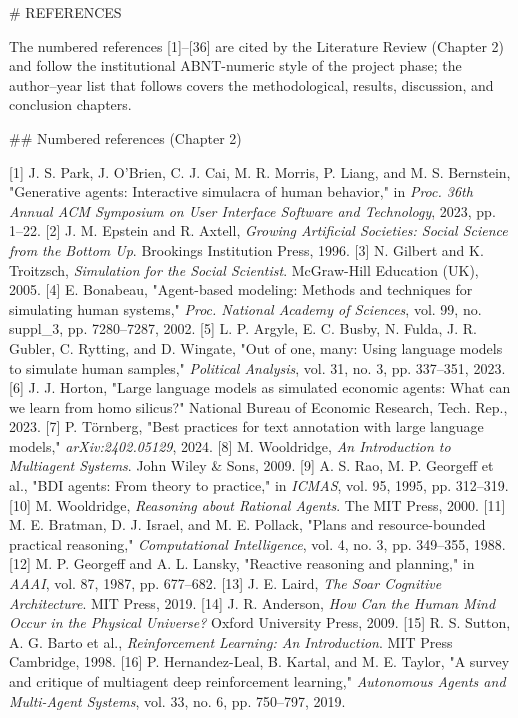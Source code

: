 \# REFERENCES

The numbered references [1]–[36] are cited by the Literature Review (Chapter 2) and follow the institutional ABNT-numeric style of the project phase; the author–year list that follows covers the methodological, results, discussion, and conclusion chapters.

\#\# Numbered references (Chapter 2)

[1] J. S. Park, J. O'Brien, C. J. Cai, M. R. Morris, P. Liang, and M. S. Bernstein, "Generative agents: Interactive simulacra of human behavior," in \textit{Proc. 36th Annual ACM Symposium on User Interface Software and Technology}, 2023, pp. 1–22.
[2] J. M. Epstein and R. Axtell, \textit{Growing Artificial Societies: Social Science from the Bottom Up}. Brookings Institution Press, 1996.
[3] N. Gilbert and K. Troitzsch, \textit{Simulation for the Social Scientist}. McGraw-Hill Education (UK), 2005.
[4] E. Bonabeau, "Agent-based modeling: Methods and techniques for simulating human systems," \textit{Proc. National Academy of Sciences}, vol. 99, no. suppl\_3, pp. 7280–7287, 2002.
[5] L. P. Argyle, E. C. Busby, N. Fulda, J. R. Gubler, C. Rytting, and D. Wingate, "Out of one, many: Using language models to simulate human samples," \textit{Political Analysis}, vol. 31, no. 3, pp. 337–351, 2023.
[6] J. J. Horton, "Large language models as simulated economic agents: What can we learn from homo silicus?" National Bureau of Economic Research, Tech. Rep., 2023.
[7] P. Törnberg, "Best practices for text annotation with large language models," \textit{arXiv:2402.05129}, 2024.
[8] M. Wooldridge, \textit{An Introduction to Multiagent Systems}. John Wiley \& Sons, 2009.
[9] A. S. Rao, M. P. Georgeff et al., "BDI agents: From theory to practice," in \textit{ICMAS}, vol. 95, 1995, pp. 312–319.
[10] M. Wooldridge, \textit{Reasoning about Rational Agents}. The MIT Press, 2000.
[11] M. E. Bratman, D. J. Israel, and M. E. Pollack, "Plans and resource-bounded practical reasoning," \textit{Computational Intelligence}, vol. 4, no. 3, pp. 349–355, 1988.
[12] M. P. Georgeff and A. L. Lansky, "Reactive reasoning and planning," in \textit{AAAI}, vol. 87, 1987, pp. 677–682.
[13] J. E. Laird, \textit{The Soar Cognitive Architecture}. MIT Press, 2019.
[14] J. R. Anderson, \textit{How Can the Human Mind Occur in the Physical Universe?} Oxford University Press, 2009.
[15] R. S. Sutton, A. G. Barto et al., \textit{Reinforcement Learning: An Introduction}. MIT Press Cambridge, 1998.
[16] P. Hernandez-Leal, B. Kartal, and M. E. Taylor, "A survey and critique of multiagent deep reinforcement learning," \textit{Autonomous Agents and Multi-Agent Systems}, vol. 33, no. 6, pp. 750–797, 2019.
